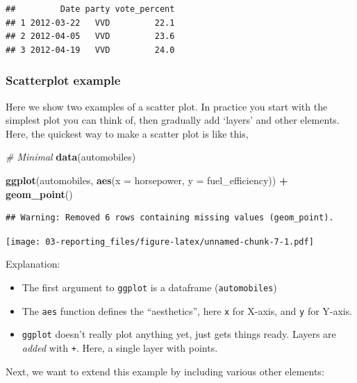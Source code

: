 \documentclass[]{book}
\newenvironment{Shaded}{\begin{snugshade}}{\end{snugshade}}
\newcommand{\CommentTok}[1]{\textcolor[rgb]{0.56,0.35,0.01}{\textit{#1}}}
\newcommand{\DataTypeTok}[1]{\textcolor[rgb]{0.13,0.29,0.53}{#1}}
\newcommand{\KeywordTok}[1]{\textcolor[rgb]{0.13,0.29,0.53}{\textbf{#1}}}
\newcommand{\NormalTok}[1]{#1}
\newcommand{\OperatorTok}[1]{\textcolor[rgb]{0.81,0.36,0.00}{\textbf{#1}}}
\newcommand{\StringTok}[1]{\textcolor[rgb]{0.31,0.60,0.02}{#1}}
\providecommand{\tightlist}{%
  \setlength{\itemsep}{0pt}\setlength{\parskip}{0pt}}
\begin{document}
\begin{verbatim}
##         Date party vote_percent
## 1 2012-03-22   VVD         22.1
## 2 2012-04-05   VVD         23.6
## 3 2012-04-19   VVD         24.0
\end{verbatim}

\hypertarget{scatterplot-example}{%
\subsubsection{Scatterplot example}\label{scatterplot-example}}

Here we show two examples of a scatter plot. In practice you start with the simplest plot you can think of, then gradually add `layers' and other elements. Here, the quickest way to make a scatter plot is like this,

\begin{Shaded}
\begin{Highlighting}[]
\CommentTok{# Minimal}
\KeywordTok{data}\NormalTok{(automobiles)}

\KeywordTok{ggplot}\NormalTok{(automobiles, }\KeywordTok{aes}\NormalTok{(}\DataTypeTok{x =}\NormalTok{ horsepower, }\DataTypeTok{y =}\NormalTok{ fuel_efficiency)) }\OperatorTok{+}
\StringTok{  }\KeywordTok{geom_point}\NormalTok{()}
\end{Highlighting}
\end{Shaded}

\begin{verbatim}
## Warning: Removed 6 rows containing missing values (geom_point).
\end{verbatim}

\texttt{[image: 03-reporting\_files/figure-latex/unnamed-chunk-7-1.pdf]}

Explanation:

\begin{itemize}
\tightlist
\item
  The first argument to \texttt{ggplot} is a dataframe (\texttt{automobiles})
\item
  The \texttt{aes} function defines the ``aesthetics'', here \texttt{x} for X-axis, and \texttt{y} for Y-axis.
\item
  \texttt{ggplot} doesn't really plot anything yet, just gets things ready. Layers are \emph{added} with \texttt{+}. Here, a single layer with points.
\end{itemize}

Next, we want to extend this example by including various other elements:
\end{document}
